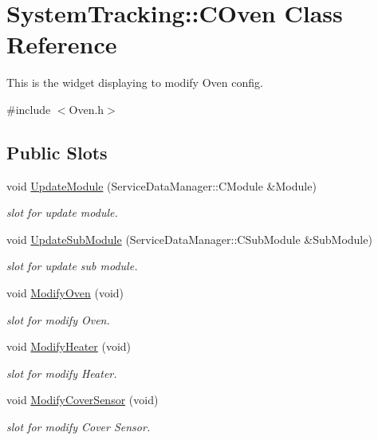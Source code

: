 \hypertarget{classSystemTracking_1_1COven}{\section{\-System\-Tracking\-:\-:\-C\-Oven \-Class \-Reference}
\label{classSystemTracking_1_1COven}
}


\-This is the widget displaying to modify \-Oven config.  




{\ttfamily \#include $<$\-Oven.\-h$>$}

\subsection*{\-Public \-Slots}
\begin{DoxyCompactItemize}
\item 
void \hyperlink{classSystemTracking_1_1COven_ad118e2dd5e1c98dcc85d43b29a7e941a}{\-Update\-Module} (\-Service\-Data\-Manager\-::\-C\-Module \&\-Module)
\begin{DoxyCompactList}\small\item\em slot for update module. \end{DoxyCompactList}\item 
void \hyperlink{classSystemTracking_1_1COven_a0a0df54be2efcad3d4aa2a529ebb1650}{\-Update\-Sub\-Module} (\-Service\-Data\-Manager\-::\-C\-Sub\-Module \&\-Sub\-Module)
\begin{DoxyCompactList}\small\item\em slot for update sub module. \end{DoxyCompactList}\item 
void \hyperlink{classSystemTracking_1_1COven_a21b2d2f965b518383334e1a3fca47ec8}{\-Modify\-Oven} (void)
\begin{DoxyCompactList}\small\item\em slot for modify \-Oven. \end{DoxyCompactList}\item 
void \hyperlink{classSystemTracking_1_1COven_a9f64e09c54ce17f6024d000a69cf65e2}{\-Modify\-Heater} (void)
\begin{DoxyCompactList}\small\item\em slot for modify \-Heater. \end{DoxyCompactList}\item 
void \hyperlink{classSystemTracking_1_1COven_aa59639414072ff28e4243a219d2e68f9}{\-Modify\-Cover\-Sensor} (void)
\begin{DoxyCompactList}\small\item\em slot for modify \-Cover \-Sensor. \end{DoxyCompactList}\item 

\end{DoxyCompactItemize}
